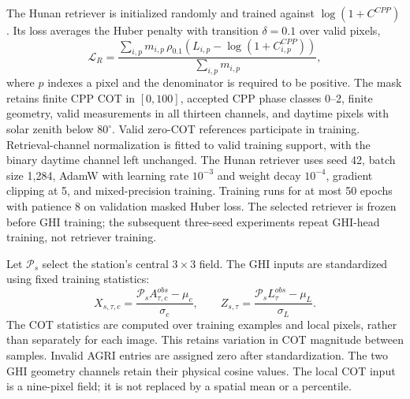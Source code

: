 \documentclass[11pt]{article}
\begin{document}
The Hunan retriever is initialized randomly and trained against $\log(1+C^{CPP})$. Its loss averages the Huber penalty with transition $\delta=0.1$ over valid pixels,
\begin{equation}
\mathcal L_R=
\frac{\sum_{i,p}m_{i,p}\,
\rho_{0.1}\!\left(L_{i,p}-\log(1+C^{CPP}_{i,p})\right)}
{\sum_{i,p}m_{i,p}},
\label{eq:retrieval-loss}
\end{equation}
where $p$ indexes a pixel and the denominator is required to be positive. The mask retains finite CPP COT in $[0,100]$, accepted CPP phase classes 0--2, finite geometry, valid measurements in all thirteen channels, and daytime pixels with solar zenith below $80^\circ$. Valid zero-COT references participate in training. Retrieval-channel normalization is fitted to valid training support, with the binary daytime channel left unchanged. The Hunan retriever uses seed 42, batch size 1,284, AdamW with learning rate $10^{-3}$ and weight decay $10^{-4}$, gradient clipping at 5, and mixed-precision training. Training runs for at most 50 epochs with patience 8 on validation masked Huber loss. The selected retriever is frozen before GHI training; the subsequent three-seed experiments repeat GHI-head training, not retriever training.

Let $\mathcal P_s$ select the station's central $3\times3$ field. The GHI inputs are standardized using fixed training statistics:
\begin{equation}
X_{s,\tau,c}=\frac{\mathcal P_s A^{obs}_{\tau,c}-\mu_c}{\sigma_c},
\qquad
Z_{s,\tau}=\frac{\mathcal P_s L^{obs}_\tau-\mu_L}{\sigma_L}.
\label{eq:standardization}
\end{equation}
The COT statistics are computed over training examples and local pixels, rather than separately for each image. This retains variation in COT magnitude between samples. Invalid AGRI entries are assigned zero after standardization. The two GHI geometry channels retain their physical cosine values. The local COT input is a nine-pixel field; it is not replaced by a spatial mean or a percentile.
\end{document}
